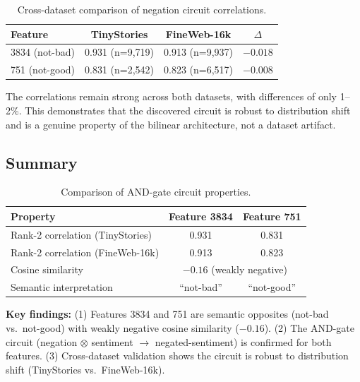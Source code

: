 \begin{table}[H]
    \centering
    \caption{Cross-dataset comparison of negation circuit correlations.}
    \label{tab:cross_dataset_fig8}
    \begin{tabular}{lccc}
        \toprule
        Feature & TinyStories & FineWeb-16k & $\Delta$ \\
        \midrule
        3834 (not-bad) & 0.931 (n=9,719) & 0.913 (n=9,937) & $-0.018$ \\
        751 (not-good) & 0.831 (n=2,542) & 0.823 (n=6,517) & $-0.008$ \\
        \bottomrule
    \end{tabular}
\end{table}

The correlations remain strong across both datasets, with differences of only 1--2\%.
This demonstrates that the discovered circuit is robust to distribution shift and is a genuine property of the bilinear architecture, not a dataset artifact.

\subsection{Summary}

\begin{table}[H]
    \centering
    \caption{Comparison of AND-gate circuit properties.}
    \label{tab:app_circuit_comparison}
    \begin{tabular}{lcc}
        \toprule
        \textbf{Property} & \textbf{Feature 3834} & \textbf{Feature 751} \\
        \midrule
        Rank-2 correlation (TinyStories) & 0.931 & 0.831 \\
        Rank-2 correlation (FineWeb-16k) & 0.913 & 0.823 \\
        Cosine similarity & \multicolumn{2}{c}{$-0.16$ (weakly negative)} \\
        Semantic interpretation & ``not-bad'' & ``not-good'' \\
        \bottomrule
    \end{tabular}
\end{table}

\textbf{Key findings:}
(1) Features 3834 and 751 are semantic opposites (not-bad vs.\ not-good) with weakly negative cosine similarity ($-0.16$).
(2) The AND-gate circuit (negation $\otimes$ sentiment $\to$ negated-sentiment) is confirmed for both features.
(3) Cross-dataset validation shows the circuit is robust to distribution shift (TinyStories vs.\ FineWeb-16k).
